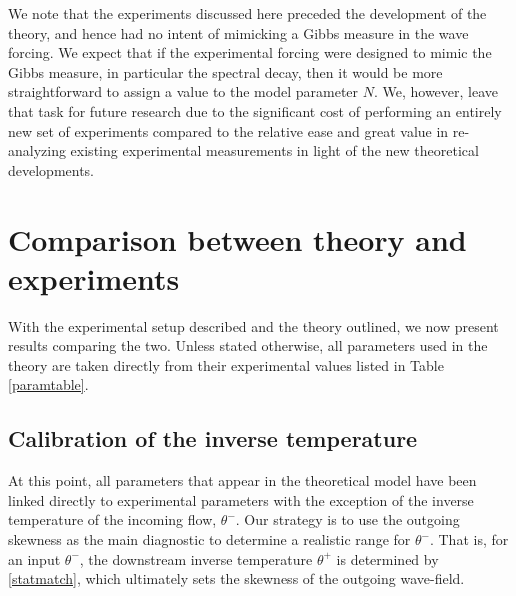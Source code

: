 \documentclass[11pt]{article}
\newcommand{\eps}{\varepsilon}
\newcommand{\lamfac}{N}
\newcommand{\drat}{\mathcal{D}}
\newcommand{\dratdn}{\drat_+}
\newcommand{\epsup}{\eps_0}
\newcommand{\delup}{\delta_0}
\newcommand{\thup}{\theta^{-}}
\newcommand{\thdn}{\theta^{+}}
\begin{document}
	We note that the experiments discussed here preceded the development of the theory, and hence had no intent of mimicking a Gibbs measure in the wave forcing. We expect that if the experimental forcing were designed to mimic the Gibbs measure, in particular the spectral decay, then it would be more straightforward to assign a value to the model parameter $\lamfac$. We, however, leave that task for future research due to the significant cost of performing an entirely new set of experiments compared to the relative ease and great value in re-analyzing existing experimental measurements in light of the new theoretical developments.

	

\section{Comparison between theory and experiments}
\label{results}

With the experimental setup described and the theory outlined, we now present results comparing the two. Unless stated otherwise, all parameters used in the theory are taken directly from their experimental values listed in Table \ref{paramtable}. 

\subsection{Calibration of the inverse temperature}

At this point, all parameters that appear in the theoretical model have been linked directly to experimental parameters with the exception of the inverse temperature of the incoming flow, $\thup$.
Our strategy is to use the outgoing skewness as the main diagnostic to determine a realistic range for $\thup$. That is, for an input $\thup$, the downstream inverse temperature $\thdn$ is determined by \eqref{statmatch}, which ultimately sets the skewness of the outgoing wave-field.
\end{document}
